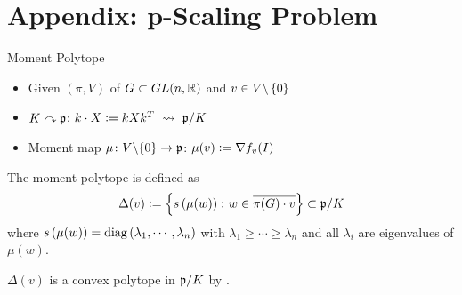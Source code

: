 \documentclass{beamer}
\begin{document}
 	\begin{frame}[allowframebreaks]
 		\printbibliography
 	\end{frame}

 	\section*{Appendix: p-Scaling Problem}

	\begin{frame}{Moment Polytope}
		\begin{itemize}
			\item Given $(\pi,V)$ of $G \subset GL(n,\mathbb{R})$ and $v \in V \backslash \left\{0\right\}$
			\item $K\curvearrowright \mathfrak{p}$: $k\cdot X \vcentcolon= kXk^T~\leadsto~ \mathfrak{p}/K$
			\item Moment map  $\mu \colon V\backslash \{0\} \rightarrow \mathfrak{p}$: $\mu(v) \vcentcolon= \nabla f_v(I)$
		\end{itemize}
		\begin{defn}
			The moment polytope is defined as
			\vspace{-0.5em}
			\begin{equation*}
				\Delta(v) \defeq \bb{s\bc{\mu(w)} \colon w \in \clo{\pi(G)\cdot v}} \subset \alg{p}/K
				\vspace{-0.5em}
			\end{equation*}
			where $s\left(\mu(w)\right) = \operatorname{diag}\left(\lambda_1,\cdots,\lambda_n\right)$ with $\lambda_1 \geqslant \cdots \geqslant\lambda_n$ and all $\lambda_i$ are eigenvalues of $\mu(w)$.
		\end{defn}
		\begin{rem} 
			$\Delta(v)$ is a convex polytope in $\mathfrak{p}/K$ by \cite{key10,key11}. 
		\end{rem}
	\end{frame}
\end{document}
